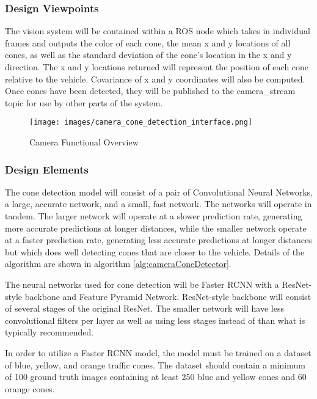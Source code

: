 \documentclass[10pt, onecolumn, draftclsnofoot, letterpaper,compsoc]{IEEEtran}
\begin{document}
\subsubsection{Design Viewpoints} %
The vision system will be contained within a ROS node which takes in individual frames and outputs the color of each cone, the mean x and y locations of all cones, as well as the standard deviation of the cone's location in the x and y direction. The x and y locations returned will represent the position of each cone relative to the vehicle. Covariance of x and y coordinates will also be computed. Once cones have been detected, they will be published to the camera\_stream topic for use by other parts of the system. 

\begin{figure}[htbp]
\centering
\label{fig:CameraInterfaceOverview}
\caption{Camera Functional Overview}
\texttt{[image: images/camera\_cone\_detection\_interface.png]}
\end{figure}

\subsubsection{Design Elements} %

The cone detection model will consist of a pair of Convolutional Neural Networks, a large, accurate network, and a small, fast network. The networks will operate in tandem. The larger network will operate at a slower prediction rate, generating more accurate predictions at longer distances, while the smaller network operate at a faster prediction rate, generating less accurate predictions at longer distances but which does well detecting cones that are closer to the vehicle. Details of the algorithm are shown in algorithm \ref{alg:cameraConeDetector}.

The neural networks used for cone detection will be Faster RCNN with a ResNet-style backbone and Feature Pyramid Network. ResNet-style backbone will consist of several stages of the original ResNet. The smaller network will have less convolutional filters per layer as well as using less stages instead of than what is typically recommended.

In order to utilize a Faster RCNN model, the model must be trained on a dataset of blue, yellow, and orange traffic cones. The dataset should contain a minimum of 100 ground truth images containing at least 250 blue and yellow cones and 60 orange cones.
\end{document}

